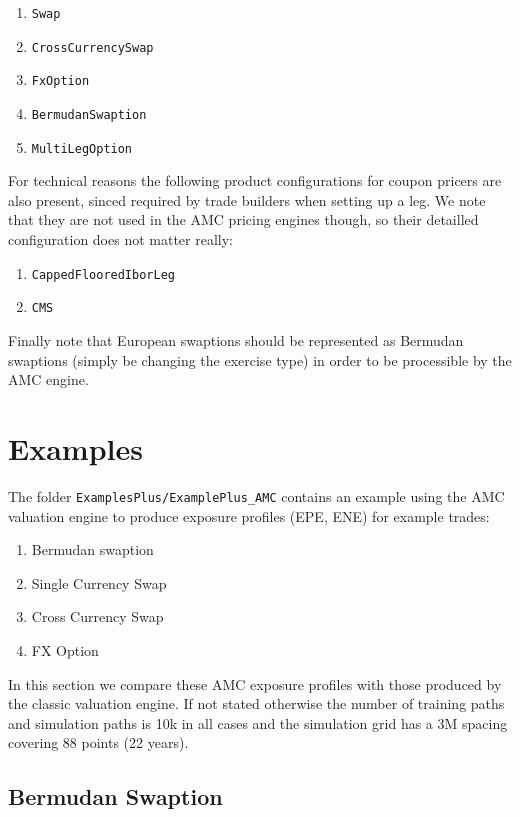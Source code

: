 \documentclass[12pt, a4paper]{article}
\begin{document}
\begin{enumerate}
\item \verb+Swap+
\item \verb+CrossCurrencySwap+
\item \verb+FxOption+
\item \verb+BermudanSwaption+
\item \verb+MultiLegOption+
\end{enumerate}

For technical reasons the following product configurations for coupon pricers are also present, sinced required by trade
builders when setting up a leg. We note that they are not used in the AMC pricing engines though, so their detailled
configuration does not matter really:

\begin{enumerate}
\item \verb+CappedFlooredIborLeg+
\item \verb+CMS+  
\end{enumerate}

Finally note that European swaptions should be represented as Bermudan swaptions (simply be changing the exercise type)
in order to be processible by the AMC engine.

\section{Examples}

The folder \verb+ExamplesPlus/ExamplePlus_AMC+ contains an example using the AMC valuation engine to produce exposure
profiles (EPE, ENE) for example trades:

\begin{enumerate}
\item Bermudan swaption
\item Single Currency Swap
\item Cross Currency Swap
\item FX Option
\end{enumerate}

In this section we compare these AMC exposure profiles with those produced by the classic valuation engine. If not
stated otherwise the number of training paths and simulation paths is 10k in all cases and the simulation grid has a 3M
spacing covering 88 points (22 years).

\subsection{Bermudan Swaption}
\end{document}
